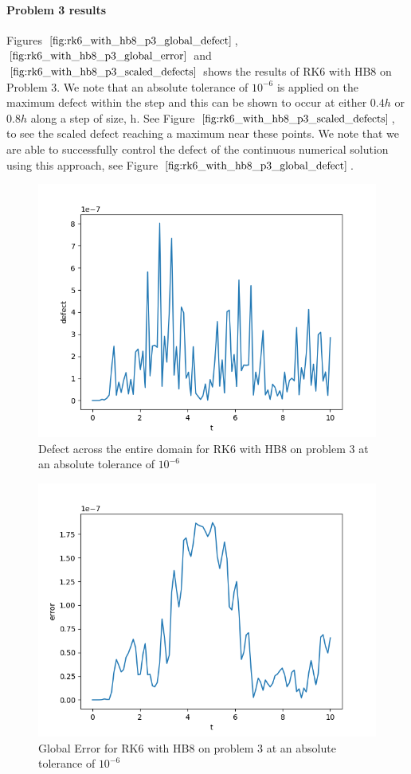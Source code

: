 \paragraph{Problem 3 results}
Figures $\ref{fig:rk6_with_hb8_p3_global_defect}$, $\ref{fig:rk6_with_hb8_p3_global_error}$ and $\ref{fig:rk6_with_hb8_p3_scaled_defects}$ shows the results of RK6 with HB8 on Problem 3. 
We note that an absolute tolerance of $10^{-6}$ is applied on the maximum defect within the step and this can be shown to occur at either $0.4h$ or $0.8h$ along a step of size, h. See Figure $\ref{fig:rk6_with_hb8_p3_scaled_defects}$, to see the scaled defect reaching a maximum near these points. We note that we are able to successfully control the defect of the continuous numerical solution using this approach, see Figure $\ref{fig:rk6_with_hb8_p3_global_defect}$. 
 

\begin{figure}[H]
\centering
\includegraphics[width=0.7\linewidth]{./figures/rk6_with_hb8_p3_global_defect}
\caption{Defect across the entire domain for RK6 with HB8 on problem 3 at an absolute tolerance of $10^{-6}$}
\label{fig:rk6_with_hb8_p3_global_defect}
\end{figure}

\begin{figure}[H]
\centering
\includegraphics[width=0.7\linewidth]{./figures/rk6_with_hb8_p3_global_error}
\caption{Global Error for RK6 with HB8 on problem 3 at an absolute tolerance of $10^{-6}$}
\label{fig:rk6_with_hb8_p3_global_error}
\end{figure}

